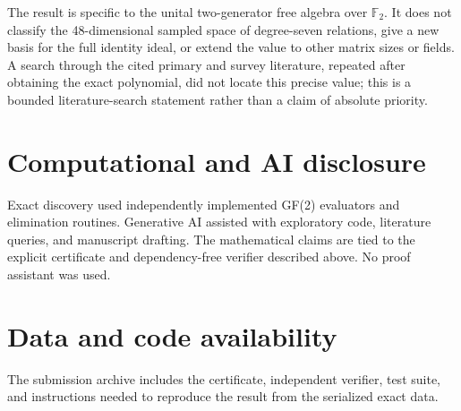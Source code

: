 \documentclass[11pt]{amsart}
\theoremstyle{definition}
\newcommand{\F}{\mathbb F}
\begin{document}
The result is specific to the unital two-generator free algebra over
\(\F_2\).  It does not classify the 48-dimensional sampled space of degree-seven
relations, give a new basis for the full identity ideal, or extend the value to
other matrix sizes or fields.  A search through the cited primary and survey
literature, repeated after obtaining the exact polynomial, did not locate this
precise value; this is a bounded literature-search statement rather than a claim
of absolute priority.

\section*{Computational and AI disclosure}

Exact discovery used independently implemented GF(2) evaluators and elimination
routines.  Generative AI assisted with exploratory code, literature queries,
and manuscript drafting.  The mathematical claims are tied to the explicit
certificate and dependency-free verifier described above.  No proof assistant
was used.

\section*{Data and code availability}

The submission archive includes the certificate, independent verifier, test
suite, and instructions needed to reproduce the result from the serialized
exact data.



\end{document}
